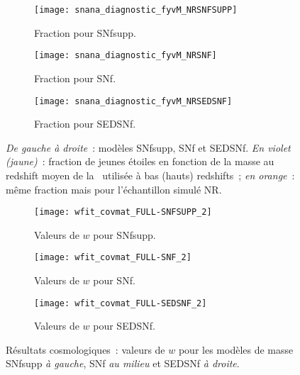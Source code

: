 \documentclass[../main/main.tex]{subfiles}
\begin{document}
\begin{landscape}
\begin{figure}[p]
    \centerfloat
    \begin{subfigure}[]{.30\linewidth}
        \centering
        \texttt{[image: snana\_diagnostic\_fyvM\_NRSNFSUPP]}
        \caption[Fraction pour SEDSNf]{Fraction pour SNfsupp.}
        \label{fig:fyvMsnfsupp}
    \end{subfigure}
    \centering
    \begin{subfigure}[]{.30\linewidth}
        \centering
        \texttt{[image: snana\_diagnostic\_fyvM\_NRSNF]}
        \caption[Fraction pour SEDSNf]{Fraction pour SNf.}
        \label{fig:fyvMsnf}
    \end{subfigure}
    \begin{subfigure}[]{.30\linewidth}
        \centering
        \texttt{[image: snana\_diagnostic\_fyvM\_NRSEDSNF]}
        \caption[Fraction pour SEDSNf]{Fraction pour SEDSNf.}
        \label{fig:fyvMsed}
    \end{subfigure}
    \caption[Évolution de la fraction de jeunes étoiles en fonction de la masse
    pour les différents modèles de masse]{\textit{De gauche à droite}~: modèles
        SNfsupp, SNf et SEDSNf. \textit{En violet (jaune)}~: fraction de jeunes
        étoiles en fonction de la masse au redshift moyen de la \hostlib\
        utilisée à bas (hauts) redshifts~; \textit{en orange}~: même fraction
    mais pour l'échantillon simulé NR.}
    \label{fig:fyvM}
\end{figure}

\begin{figure}[h!]
    \centerfloat
    \begin{subfigure}[]{.30\linewidth}
        \centering
        \texttt{[image: wfit\_covmat\_FULL-SNFSUPP\_2]}
        \caption[Valeurs de $w$ avec le modèle de masse SNf]{Valeurs de
        $w$ pour SNfsupp.}
        \label{fig:wsnfsupp}
    \end{subfigure}
    \begin{subfigure}[]{.30\linewidth}
        \centering
        \texttt{[image: wfit\_covmat\_FULL-SNF\_2]}
        \caption[Valeurs de $w$ avec le modèle de masse SNf]{Valeurs de
        $w$ pour SNf.}
        \label{fig:wsnf}
    \end{subfigure}
    \begin{subfigure}[]{.30\linewidth}
        \centering
        \texttt{[image: wfit\_covmat\_FULL-SEDSNF\_2]}
        \caption[Valeurs de $w$ avec le modèle de masse SEDSNf]{Valeurs de
        $w$ pour SEDSNf.}
        \label{fig:wsed}
    \end{subfigure}
    \caption[Résultats cosmologiques~: $w$ selon le modèle de
    masse]{Résultats cosmologiques~: valeurs de $w$ pour les modèles de
        masse SNfsupp \textit{à gauche}, SNf \textit{au milieu} et SEDSNf
    \textit{à droite}.}
    \label{fig:wdiff}
\end{figure}
\end{landscape}
\end{document}
